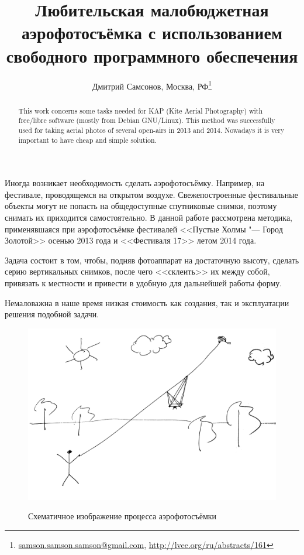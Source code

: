 \documentclass[10pt, a5paper]{article}
\begin{document}
\title{Любительская малобюджетная аэрофотосъёмка с использованием свободного программного обеспечения}
\author{Дмитрий Самсонов, Москва, РФ\footnote{\url{samson.samson.samson@gmail.com}, \url{http://lvee.org/ru/abstracts/161}}}
\maketitle
\begin{abstract}
This work concerns some tasks needed for KAP (Kite Aerial Photography) with free/libre software (mostly from Debian \linebreak GNU/Linux). This method was successfully used for taking aerial photos of several open-airs in 2013 and 2014. Nowadays it is very important to have cheap and simple solution. 
\end{abstract}
Иногда возникает необходимость сделать аэрофотосъёмку. Например, на фестивале, проводящемся на открытом воздухе. Свежепостроенные фестивальные объекты могут не попасть на общедоступные спутниковые снимки, поэтому снимать их приходится самостоятельно. В данной работе рассмотрена методика, применявшаяся при аэрофотосъёмке фестивалей <<Пустые Холмы "--- Город Золотой>> осенью 2013 года и <<Фестиваля 17>> летом 2014 года.

Задача состоит в том, чтобы, подняв фотоаппарат на достаточную высоту, сделать серию вертикальных снимков, после чего <<склеить>> их между собой, привязать к местности и привести в удобную для дальнейшей работы форму.

Немаловажна в наше время низкая стоимость как создания, так и эксплуатации решения подобной задачи.

\begin{figure}[h!]
  \centering \label{samsonov1}
  \includegraphics[scale=0.1]{14_2015_fig1}
  \caption{Схематичное изображение процесса аэрофотосъёмки}
\end{figure}
\end{document}
